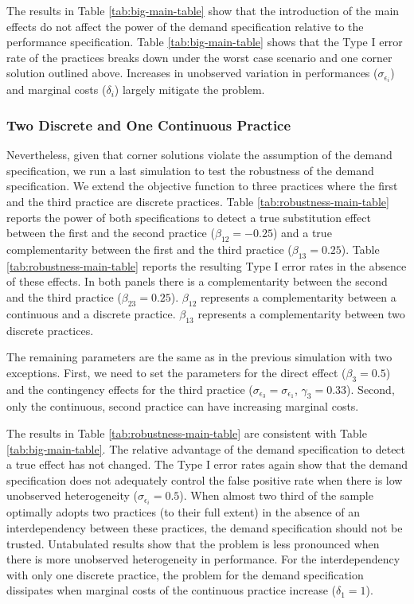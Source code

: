 \documentclass[12pt]{article}
\begin{document}
The results in Table \ref{tab:big-main-table} show that the introduction of the main effects do not affect the power of the demand specification relative to the performance specification. Table \ref{tab:big-main-table} shows that the Type I error rate of the practices breaks down under the worst case scenario and one corner solution outlined above. Increases in unobserved variation in performances ($\sigma_{\epsilon_i}$) and marginal costs ($\delta_i$) largely mitigate the problem. 

\subsubsection{Two Discrete and One Continuous Practice}

Nevertheless, given that corner solutions violate the assumption of the demand specification, we run a last simulation to test the robustness of the demand specification. We extend the objective function to three practices where the first and the third practice are discrete practices. Table \ref{tab:robustness-main-table} reports the power of both specifications to detect a true substitution effect between the first and the second practice ($\beta_{12} = -0.25$) and a true complementarity between the first and the third practice ($\beta_{13} = 0.25$). Table \ref{tab:robustness-main-table} reports the resulting Type I error rates in the absence of these effects. In both panels there is a complementarity between the second and the third practice ($\beta_{23} = 0.25$). $\beta_{12}$ represents a complementarity between a continuous and a discrete practice. $\beta_{13}$ represents a complementarity between two discrete practices.

The remaining parameters are the same as in the previous simulation with two exceptions. First, we need to set the parameters for the direct effect ($\beta_3 = 0.5$) and the contingency effects for the third practice ($\sigma_{\epsilon_3} = \sigma_{\epsilon_1}$, $\gamma_3 = 0.33$). Second, only the continuous, second practice can have increasing marginal costs. 

The results in Table \ref{tab:robustness-main-table} are consistent with Table \ref{tab:big-main-table}. The relative advantage of the demand specification to detect a true effect has not changed. The Type I error rates again show that the demand specification does not adequately control the false positive rate when there is low unobserved heterogeneity ($\sigma_{\epsilon_i} = 0.5$). When almost two third of the sample optimally adopts two practices (to their full extent) in the absence of an interdependency between these practices, the demand specification should not be trusted. Untabulated results show that the problem is less pronounced when there is more unobserved heterogeneity in performance. For the interdependency with only one discrete practice, the problem for the demand specification dissipates when marginal costs of the continuous practice increase ($\delta_1 = 1$). 
\end{document}
